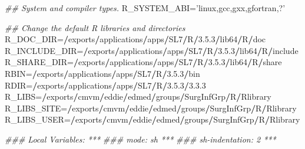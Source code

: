 \documentclass[
]{book}
\newenvironment{Shaded}{\begin{snugshade}}{\end{snugshade}}
\newcommand{\CommentTok}[1]{\textcolor[rgb]{0.56,0.35,0.01}{\textit{#1}}}
\newcommand{\DecValTok}[1]{\textcolor[rgb]{0.00,0.00,0.81}{#1}}
\newcommand{\ErrorTok}[1]{\textcolor[rgb]{0.64,0.00,0.00}{\textbf{#1}}}
\newcommand{\FloatTok}[1]{\textcolor[rgb]{0.00,0.00,0.81}{#1}}
\newcommand{\NormalTok}[1]{#1}
\newcommand{\OperatorTok}[1]{\textcolor[rgb]{0.81,0.36,0.00}{\textbf{#1}}}
\newcommand{\StringTok}[1]{\textcolor[rgb]{0.31,0.60,0.02}{#1}}
\begin{document}
\begin{Shaded}
\begin{Highlighting}[]
\CommentTok{## System and compiler types.}
\NormalTok{R_SYSTEM_ABI=}\StringTok{'linux,gcc,gxx,gfortran,?'}


\CommentTok{## Change the default R libraries and directories}
\NormalTok{R_DOC_DIR=}\ErrorTok{/}\NormalTok{exports}\OperatorTok{/}\NormalTok{applications}\OperatorTok{/}\NormalTok{apps}\OperatorTok{/}\NormalTok{SL7}\OperatorTok{/}\NormalTok{R}\OperatorTok{/}\DecValTok{3}\NormalTok{.}\FloatTok{5.3}\OperatorTok{/}\NormalTok{lib64}\OperatorTok{/}\NormalTok{R}\OperatorTok{/}\NormalTok{doc}
\NormalTok{R_INCLUDE_DIR=}\ErrorTok{/}\NormalTok{exports}\OperatorTok{/}\NormalTok{applications}\OperatorTok{/}\NormalTok{apps}\OperatorTok{/}\NormalTok{SL7}\OperatorTok{/}\NormalTok{R}\OperatorTok{/}\DecValTok{3}\NormalTok{.}\FloatTok{5.3}\OperatorTok{/}\NormalTok{lib64}\OperatorTok{/}\NormalTok{R}\OperatorTok{/}\NormalTok{include}
\NormalTok{R_SHARE_DIR=}\ErrorTok{/}\NormalTok{exports}\OperatorTok{/}\NormalTok{applications}\OperatorTok{/}\NormalTok{apps}\OperatorTok{/}\NormalTok{SL7}\OperatorTok{/}\NormalTok{R}\OperatorTok{/}\DecValTok{3}\NormalTok{.}\FloatTok{5.3}\OperatorTok{/}\NormalTok{lib64}\OperatorTok{/}\NormalTok{R}\OperatorTok{/}\NormalTok{share}
\NormalTok{RBIN=}\ErrorTok{/}\NormalTok{exports}\OperatorTok{/}\NormalTok{applications}\OperatorTok{/}\NormalTok{apps}\OperatorTok{/}\NormalTok{SL7}\OperatorTok{/}\NormalTok{R}\OperatorTok{/}\DecValTok{3}\NormalTok{.}\FloatTok{5.3}\OperatorTok{/}\NormalTok{bin}
\NormalTok{RDIR=}\ErrorTok{/}\NormalTok{exports}\OperatorTok{/}\NormalTok{applications}\OperatorTok{/}\NormalTok{apps}\OperatorTok{/}\NormalTok{SL7}\OperatorTok{/}\NormalTok{R}\OperatorTok{/}\DecValTok{3}\NormalTok{.}\FloatTok{5.3}\OperatorTok{/}\DecValTok{3}\NormalTok{.}\FloatTok{3.3}
\NormalTok{R_LIBS=}\ErrorTok{/}\NormalTok{exports}\OperatorTok{/}\NormalTok{cmvm}\OperatorTok{/}\NormalTok{eddie}\OperatorTok{/}\NormalTok{edmed}\OperatorTok{/}\NormalTok{groups}\OperatorTok{/}\NormalTok{SurgInfGrp}\OperatorTok{/}\NormalTok{R}\OperatorTok{/}\NormalTok{Rlibrary}
\NormalTok{R_LIBS_SITE=}\ErrorTok{/}\NormalTok{exports}\OperatorTok{/}\NormalTok{cmvm}\OperatorTok{/}\NormalTok{eddie}\OperatorTok{/}\NormalTok{edmed}\OperatorTok{/}\NormalTok{groups}\OperatorTok{/}\NormalTok{SurgInfGrp}\OperatorTok{/}\NormalTok{R}\OperatorTok{/}\NormalTok{Rlibrary}
\NormalTok{R_LIBS_USER=}\ErrorTok{/}\NormalTok{exports}\OperatorTok{/}\NormalTok{cmvm}\OperatorTok{/}\NormalTok{eddie}\OperatorTok{/}\NormalTok{edmed}\OperatorTok{/}\NormalTok{groups}\OperatorTok{/}\NormalTok{SurgInfGrp}\OperatorTok{/}\NormalTok{R}\OperatorTok{/}\NormalTok{Rlibrary}




\CommentTok{### Local Variables: ***}
\CommentTok{### mode: sh ***}
\CommentTok{### sh-indentation: 2 ***}
\end{Highlighting}
\end{Shaded}
\end{document}
